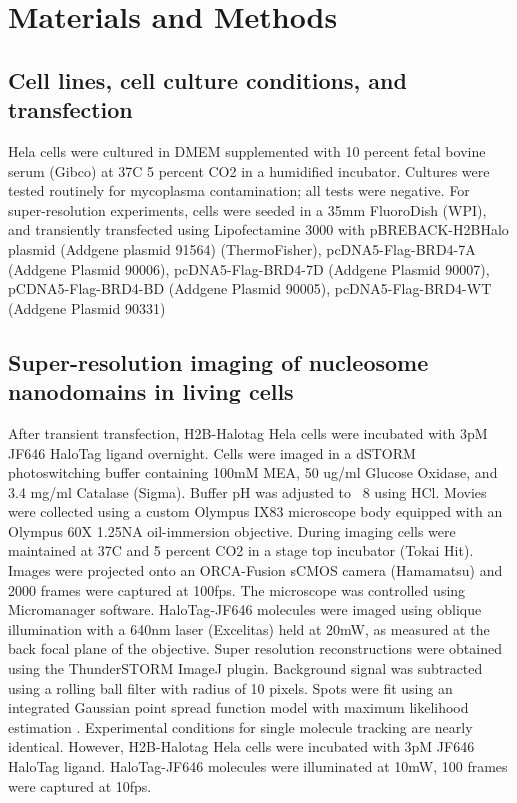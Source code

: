 \section{Materials and Methods}

\subsection{Cell lines, cell culture conditions, and transfection}

Hela cells were cultured in DMEM supplemented with 10 percent fetal bovine serum (Gibco) at 37C 5 percent CO2 in a humidified incubator. Cultures were tested routinely for mycoplasma contamination; all tests were negative. For super-resolution experiments, cells were seeded in a 35mm FluoroDish (WPI), and transiently transfected using Lipofectamine 3000 with pBREBACK-H2BHalo plasmid (Addgene plasmid 91564) (ThermoFisher), pcDNA5-Flag-BRD4-7A (Addgene Plasmid 90006), pcDNA5-Flag-BRD4-7D (Addgene Plasmid 90007), pCDNA5-Flag-BRD4-BD (Addgene Plasmid 90005), pcDNA5-Flag-BRD4-WT (Addgene Plasmid 90331)

\subsection{Super-resolution imaging of nucleosome nanodomains in living cells}

After transient transfection, H2B-Halotag Hela cells were incubated with 3pM JF646 HaloTag ligand overnight. Cells were imaged in a dSTORM photoswitching buffer containing 100mM MEA, 50 ug/ml Glucose Oxidase, and 3.4 mg/ml Catalase (Sigma). Buffer pH was adjusted to ~8 using HCl. Movies were collected using a custom Olympus IX83 microscope body equipped with an Olympus 60X 1.25NA oil-immersion objective. During imaging cells were maintained at 37C and 5 percent CO2 in a stage top incubator (Tokai Hit). Images were projected onto an ORCA-Fusion sCMOS camera (Hamamatsu) and 2000 frames were captured at 100fps. The microscope was controlled using Micromanager software. HaloTag-JF646 molecules were imaged using oblique illumination with a 640nm laser (Excelitas) held at 20mW, as measured at the back focal plane of the objective. Super resolution reconstructions were obtained using the ThunderSTORM ImageJ plugin. Background signal was subtracted using a rolling ball filter with radius of 10 pixels. Spots were fit using an integrated Gaussian point spread function model with maximum likelihood estimation \parencite{Smith2010,Huang2013}. Experimental conditions for single molecule tracking are nearly identical. However, H2B-Halotag Hela cells were incubated with 3pM JF646 HaloTag ligand. HaloTag-JF646 molecules were illuminated at 10mW, 100 frames were captured at 10fps. 

